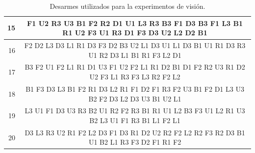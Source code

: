 {\begin{table}[h!]
{\begin{tabular}{|r|c|}
		15 & F1 U2 R3 U3 B1 F2 R2 D1 U1 L3 R3 B3 F1 D3 B3 F1 L3 B1 R1 U2 F3 U1 R3 D1 F3 D3 U2 L2 D2 B1 \\ \hline
		16 & F2 D2 L3 D3 L1 R1 D3 F3 D2 B3 U2 L1 D3 U1 L1 D3 B1 U1 R1 D3 R3 U1 R2 D3 L1 B1 R1 F3 L2 D1 \\ \hline
		17 & B3 F2 U1 F2 L1 R1 D1 U3 F1 U2 F2 L1 R1 D2 B1 D1 F2 R2 U3 R1 D2 U2 F3 L1 R3 F3 L3 R2 F2 L2 \\ \hline
		18 & B1 F3 D3 L3 B1 F2 R1 D3 L2 R1 F1 D2 F1 R3 F2 U3 B1 F2 D1 L3 U3 B2 F2 D3 L2 D3 U3 B1 U2 L1 \\ \hline
		19 & L3 U1 F1 D3 U3 R3 B2 U1 R2 F2 R3 B1 R1 U1 L2 B3 F3 U1 L2 R1 U3 B2 L3 U1 F1 R3 B1 L1 F2 L1 \\ \hline
		20 & D3 L3 R3 U2 R1 F2 L2 D3 F1 D3 R1 D2 U2 R2 F2 L2 R2 F3 R2 D3 B1 U1 B2 L1 R3 F3 D2 F1 R1 F2 \\ \hline
	\end{tabular}
	}
	\caption{Desarmes utilizados para la experimentos de visión.}
	\label{vision}
\end{table}

}
